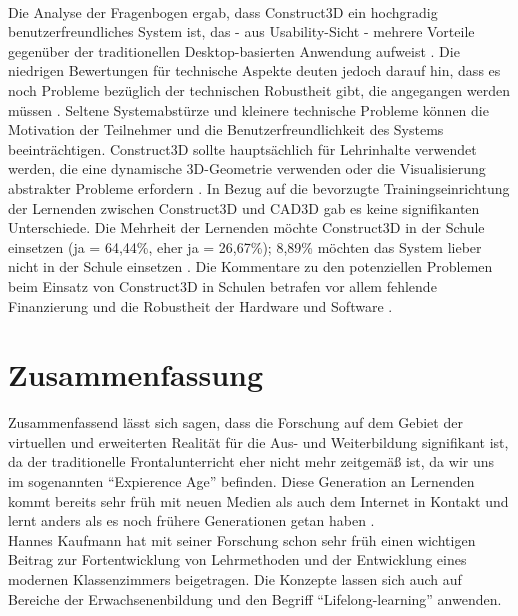 \documentclass[deutsch]{llncs}
\begin{document}
\noindent \\
Die Analyse der Fragenbogen ergab, dass Construct3D ein hochgradig benutzerfreundliches System ist, das - aus Usability-Sicht - mehrere Vorteile gegenüber der traditionellen Desktop-basierten Anwendung aufweist \cite{Kaufmann_summaryof}. Die niedrigen Bewertungen für technische Aspekte deuten jedoch darauf hin, dass es noch Probleme bezüglich der technischen Robustheit gibt, die angegangen werden müssen \cite{Kaufmann_summaryof}. Seltene Systemabstürze und kleinere technische Probleme können die Motivation der Teilnehmer und die Benutzerfreundlichkeit des Systems beeinträchtigen. Construct3D sollte hauptsächlich für Lehrinhalte verwendet werden, die eine dynamische 3D-Geometrie verwenden oder die Visualisierung abstrakter Probleme erfordern \cite{Kaufmann_summaryof}. In Bezug auf die bevorzugte Trainingseinrichtung der Lernenden zwischen Construct3D und CAD3D gab es keine signifikanten Unterschiede. Die Mehrheit der Lernenden möchte Construct3D in der Schule einsetzen (ja = 64,44\%, eher ja = 26,67\%); 8,89\% möchten das System lieber nicht in der Schule einsetzen \cite{Kaufmann_summaryof}.  Die Kommentare zu den potenziellen Problemen beim Einsatz von Construct3D in Schulen betrafen vor allem fehlende Finanzierung und die Robustheit der Hardware und Software \cite{Kaufmann_summaryof}.\\

\section{Zusammenfassung}
Zusammenfassend lässt sich sagen, dass die Forschung auf dem Gebiet der virtuellen und erweiterten Realität für die Aus- und Weiterbildung signifikant ist, da der traditionelle Frontalunterricht eher nicht mehr zeitgemäß ist, da wir uns im sogenannten ``Expierence Age'' befinden. Diese Generation an Lernenden kommt bereits sehr früh mit neuen Medien als auch dem Internet in Kontakt und lernt anders als es noch frühere Generationen getan haben \cite{Hu-Au}. \\
Hannes Kaufmann hat mit seiner Forschung schon sehr früh einen wichtigen Beitrag zur Fortentwicklung von Lehrmethoden und der Entwicklung eines modernen Klassenzimmers beigetragen. 
Die Konzepte lassen sich auch auf Bereiche der Erwachsenenbildung und den Begriff ``Lifelong-learning'' anwenden. 

\label{sec:bib}

\printbibliography
\end{document}
